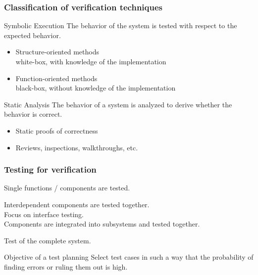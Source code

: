 \begin{frame}
\frametitle{Classification of verification techniques}

\begin{block}{Symbolic Execution}
The behavior of the system is tested with respect to the expected behavior.
\begin{itemize}
  \item Structure-oriented methods\\
        white-box, with knowledge of the implementation 
  \item Function-oriented methods\\
        black-box, without knowledge of the implementation
\end{itemize}
\end{block}
 
\vspace{1ex}
\begin{block}{Static Analysis}
The behavior of a system is analyzed to derive whether the behavior is correct.
\begin{itemize}
  \item Static proofs of correctness
  \item Reviews, inspections, walkthroughs, etc.
\end{itemize}
\end{block}
\end{frame}


\begin{frame}
\frametitle{Testing for verification}
\begin{description}
  \item[Unit-Test]
  Single functions / components are tested.
  \item[Integration test]
  Interdependent components are tested together.\\
            Focus on interface testing.\\
        Components are integrated into subsystems and tested together.
  \item[System test]
  Test of the complete system.
\end{description}  
\begin{block}{Objective of a test planning}
Select test cases in such a way that the probability of finding errors or ruling them out is high.
\end{block}
\end{frame}

